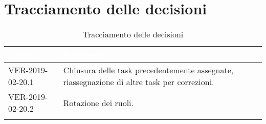 
\section{Tracciamento delle decisioni}

\begin{longtable}{|C{.40\textwidth}|C{.60\textwidth}|}
\hline
{}\textbf{\textcolor{white}{Codice}} & \textbf{\textcolor{white}{Decisione}}\\
\hline
VER-2019-02-20.1 & Chiusura delle task precedentemente assegnate, riassegnazione di altre task per correzioni.\\
\hline
{}VER-2019-02-20.2 & Rotazione dei ruoli. \\
\hline
\caption{Tracciamento delle decisioni}
\end{longtable}

